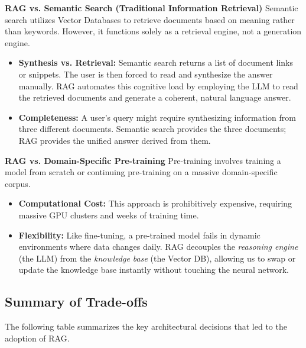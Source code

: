 \textbf{RAG vs. Semantic Search (Traditional Information Retrieval)}
Semantic search utilizes Vector Databases to retrieve documents based on meaning rather than keywords. However, it functions solely as a retrieval engine, not a generation engine.

\begin{itemize}
    \item \textbf{Synthesis vs. Retrieval:} Semantic search returns a list of document links or snippets. The user is then forced to read and synthesize the answer manually. RAG automates this cognitive load by employing the LLM to read the retrieved documents and generate a coherent, natural language answer.
    \item \textbf{Completeness:} A user's query might require synthesizing information from three different documents. Semantic search provides the three documents; RAG provides the unified answer derived from them.
\end{itemize}

\textbf{RAG vs. Domain-Specific Pre-training}
Pre-training involves training a model from scratch or continuing pre-training on a massive domain-specific corpus.

\begin{itemize}
    \item \textbf{Computational Cost:} This approach is prohibitively expensive, requiring massive GPU clusters and weeks of training time.
    \item \textbf{Flexibility:} Like fine-tuning, a pre-trained model fails in dynamic environments where data changes daily. RAG decouples the \textit{reasoning engine} (the LLM) from the \textit{knowledge base} (the Vector DB), allowing us to swap or update the knowledge base instantly without touching the neural network.
\end{itemize}

\subsection{Summary of Trade-offs}

The following table summarizes the key architectural decisions that led to the adoption of RAG.

